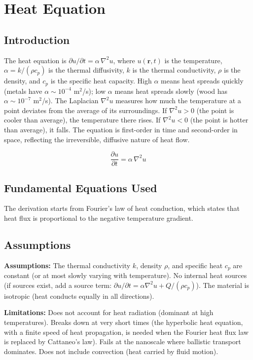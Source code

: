 \chapter{Heat Equation}

\section*{Introduction}

The heat equation is $\partial u/\partial t = \alpha\,\nabla^2 u$, where $u(\mathbf{r}, t)$ is the temperature, $\alpha = k/(\rho c_p)$ is the thermal diffusivity, $k$ is the thermal conductivity, $\rho$ is the density, and $c_p$ is the specific heat capacity. High $\alpha$ means heat spreads quickly (metals have $\alpha \sim 10^{-4}$ m$^2$/s); low $\alpha$ means heat spreads slowly (wood has $\alpha \sim 10^{-7}$ m$^2$/s). The Laplacian $\nabla^2 u$ measures how much the temperature at a point deviates from the average of its surroundings. If $\nabla^2 u > 0$ (the point is cooler than average), the temperature there rises. If $\nabla^2 u < 0$ (the point is hotter than average), it falls. The equation is first-order in time and second-order in space, reflecting the irreversible, diffusive nature of heat flow.


\[
\frac{\partial u}{\partial t}=\alpha\,\nabla^2 u
\]

\section*{Fundamental Equations Used}

The derivation starts from Fourier's law of heat conduction, which states that heat flux is proportional to the negative temperature gradient.

\section*{Assumptions}

\textbf{Assumptions:} The thermal conductivity $k$, density $\rho$, and specific heat $c_p$ are constant (or at most slowly varying with temperature). No internal heat sources (if sources exist, add a source term: $\partial u/\partial t = \alpha\nabla^2 u + Q/(\rho c_p)$). The material is isotropic (heat conducts equally in all directions).


\textbf{Limitations:} Does not account for heat radiation (dominant at high temperatures). Breaks down at very short times (the hyperbolic heat equation, with a finite speed of heat propagation, is needed when the Fourier heat flux law is replaced by Cattaneo's law). Fails at the nanoscale where ballistic transport dominates. Does not include convection (heat carried by fluid motion).


